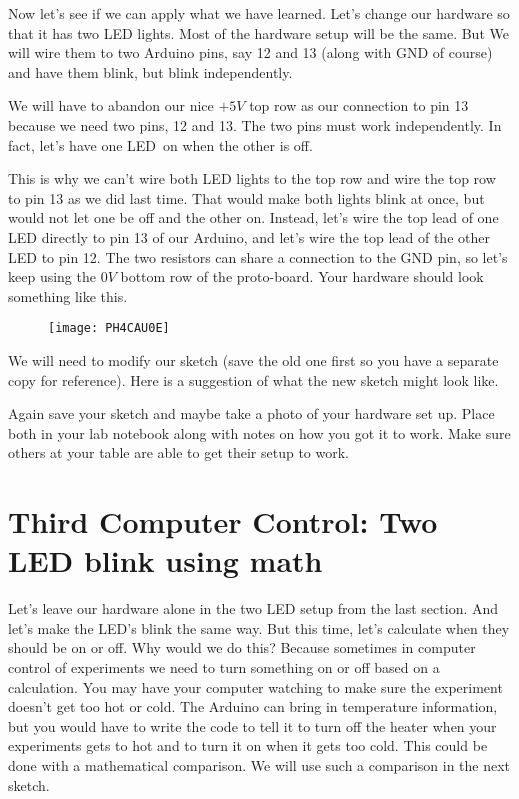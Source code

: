 Now let's see if we can apply what we have learned. Let's change our hardware so that it has two LED lights. Most of the hardware setup will be the same. But We will wire them to two Arduino pins, say 12 and 13 (along with GND of course) and have them blink, but blink independently.

We will have to abandon our nice $+5\unit{V}$ top row as our connection to pin 13 because we need two pins, 12 and 13. The two pins must work independently. In fact, let's have one LED\ on when the other is off.

This is why we can't wire both LED lights to the top row and wire the top row to pin 13 as we did last time. That would make both lights blink at once, but would not let one be off and the other on. Instead, let's wire the top lead of one LED directly to pin 13 of our Arduino, and let's wire the top lead of the other LED to pin 12. The two resistors can share a connection to the GND pin, so let's keep using the $0\unit{V}$ bottom row of the proto-board. Your hardware should look something like this.

\begin{figure}[h!]
	\centering
	\texttt{[image: PH4CAU0E]}
\end{figure}

We will need to modify our sketch (save the old one first so you have a separate copy for reference). Here is a suggestion of what the new sketch might look like.




Again save your sketch and maybe take a photo of your hardware set up. Place both in your lab notebook along with notes on how you got it to work. Make sure others at your table are able to get their setup to work. 

\section{Third Computer Control: Two LED blink using math}

Let's leave our hardware alone in the two LED setup from the last section. And let's make the LED's blink the same way. But this time, let's calculate when they should be on or off. Why would we do this? Because sometimes in computer control of experiments we need to turn something on or off based on a calculation. You may have your computer watching to make sure the experiment doesn't get too hot or cold. The Arduino can bring in temperature information, but you would have to write the code to tell it to turn off the heater when your experiments gets to hot and to turn it on when it gets too cold. This could be done with a mathematical comparison. We will use such a comparison in the next sketch.

